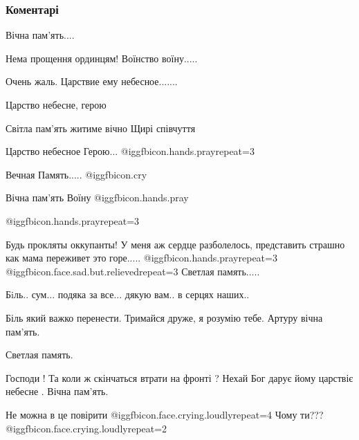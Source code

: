  
 
 
 
 
\subsubsection{Коментарі}

\begin{itemize} %
Вічна пам'ять....

Нема прощення ординцям! Воїнство воїну.....

Очень жаль. Царствие ему небесное.......

Царство небесне, герою

Світла пам'ять житиме вічно Щирі співчуття

Царство небесное Герою... @igg{fbicon.hands.pray}{repeat=3} 

Вечная Память..... @igg{fbicon.cry} 

Вічна пам'ять Воїну @igg{fbicon.hands.pray} 

 @igg{fbicon.hands.pray}{repeat=3} 


Будь прокляты оккупанты! У меня аж сердце разболелось, представить страшно как
мама переживет это горе..... @igg{fbicon.hands.pray}{repeat=3}  @igg{fbicon.face.sad.but.relieved}{repeat=3}  Светлая память.....

Бiль.. сум... подяка за все... дякую вам.. в серцях наших..


Біль який важко перенести. Тримайся друже, я розумію тебе. Артуру вічна пам'ять.

Светлая память.

Господи ! Та коли ж скінчаться втрати на фронті ?
Нехай Бог дарує йому царствіє небесне .
Вічна пам'ять.

Не можна в це повірити  @igg{fbicon.face.crying.loudly}{repeat=4} 
Чому ти??? @igg{fbicon.face.crying.loudly}{repeat=2} 


\end{itemize}
